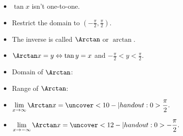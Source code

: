 \begin{frame}
\begin{columns}[c]
\begin{itemize}
\item<1->  $\tan x$ isn't one-to-one.
\item<2->  Restrict the domain to $(-\frac{\pi}2, \frac{\pi}2)$.
\item<3->  The inverse is called $\Arctan$ or $\arctan$.
\item<4->  $\Arctan x = y \Leftrightarrow \tan y = x$ and $-\frac{\pi}2 < y < \frac{\pi}2$.
\item<5->  \alert<handout:0| 5-6>{Domain of $\Arctan$: }
\item<5->  \alert<handout:0| 7-8>{Range of $\Arctan$: }
\item<9->  \alert<handout:0| 9-10>{$\displaystyle \lim_{x\rightarrow \infty} \Arctan x = \uncover<10-| handout:0>{\frac{\pi}2.}$}
\item<9->  \alert<handout:0| 11-12>{$\displaystyle \lim_{x\rightarrow - \infty} \Arctan x = \uncover<12-| handout:0>{- \frac{\pi}2.}$}
\end{itemize}
\end{columns}
\end{frame}
